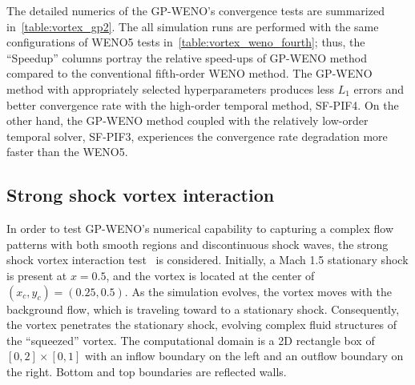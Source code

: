 The detailed numerics of the GP-WENO's convergence tests are summarized in~\cref{table:vortex_gp2}.
The all simulation runs are performed with the same configurations of WENO5 tests in~\cref{table:vortex_weno_fourth};
thus, the ``Speedup'' columns portray the relative speed-ups of GP-WENO method
compared to the conventional fifth-order WENO method.
The GP-WENO method with appropriately selected hyperparameters
produces less \( L_{1} \) errors and better convergence rate
with the high-order temporal method, SF-PIF4.
On the other hand, the GP-WENO method coupled with the relatively low-order temporal solver, SF-PIF3,
experiences the convergence rate degradation more faster than the WENO5.







\subsection{Strong shock vortex interaction}\label{subsec:shock_vortex}

In order to test GP-WENO's numerical capability to capturing
a complex flow patterns with both smooth regions and discontinuous shock waves,
the strong shock vortex interaction test~\cite{cheng2019two,galbraith5th} is considered.
Initially, a Mach 1.5 stationary shock is present at \( x = 0.5 \),
and the vortex is located at the center of \( (x_{c}, y_{c}) = (0.25, 0.5) \).
As the simulation evolves, the vortex moves with the background flow,
which is traveling toward to a stationary shock.
Consequently, the vortex penetrates the stationary shock,
evolving complex fluid structures of the ``squeezed'' vortex.
The computational domain is a 2D rectangle box of \( [0,2]\times[0,1] \)
with an inflow boundary on the left and an outflow boundary on the right.
Bottom and top boundaries are reflected walls.

